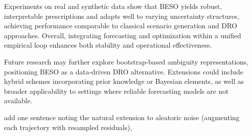 \documentclass[mnsc,sglanonrev]{informs4}  %
\theoremstyle{remark}\newtheorem{remark}{Remark}
\begin{document}
Experiments on real and synthetic data show that BESO yields robust, interpretable prescriptions and adapts well to varying uncertainty structures, achieving performance comparable to classical scenario generation and DRO approaches. Overall, integrating forecasting and optimization within a unified empirical loop enhances both stability and operational effectiveness.

Future research may further explore bootstrap-based ambiguity representations, positioning BESO as a data-driven DRO alternative. Extensions could include hybrid schemes incorporating prior knowledge or Bayesian elements, as well as broader applicability to settings where reliable forecasting models are not available.

add one sentence noting the natural extension to aleatoric noise (augmenting each trajectory with resampled residuals),

\end{document}
